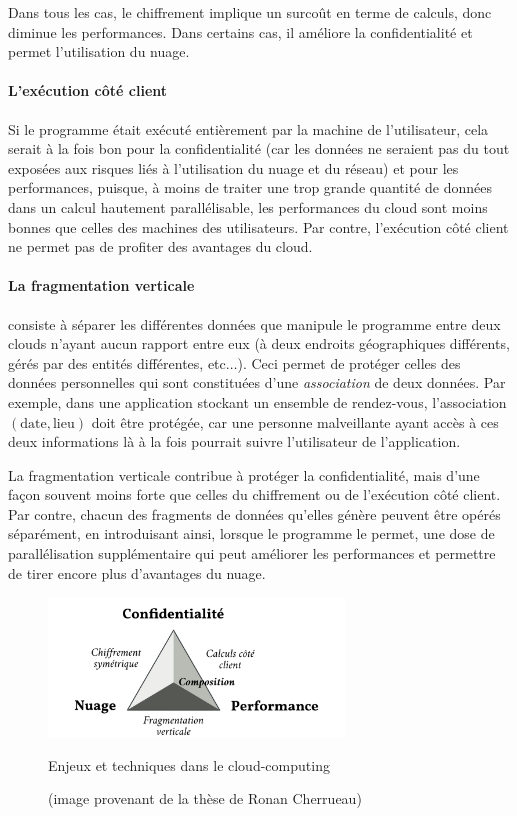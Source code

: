 Dans tous les cas, le chiffrement implique un surcoût en terme de calculs,
donc diminue les performances. Dans certains cas, il améliore la confidentialité
et permet l'utilisation du nuage.

\paragraph{L'exécution côté client}
Si le programme était exécuté entièrement par la machine de l'utilisateur,
cela serait à la fois bon pour la confidentialité (car les données
ne seraient pas du tout exposées aux risques liés à l'utilisation du nuage
et du réseau) et pour les performances, puisque, à moins de traiter une 
trop grande quantité de données dans un calcul hautement parallélisable,
les performances du cloud sont moins bonnes que celles des machines des utilisateurs.
Par contre, l'exécution côté client ne permet pas de profiter des avantages du cloud.

\paragraph{La fragmentation verticale} consiste à séparer les différentes données
que manipule le programme entre deux clouds n'ayant aucun rapport entre eux
(à deux endroits géographiques différents, gérés par des entités différentes,
etc$\dots$).
Ceci permet de protéger celles des données personnelles qui sont constituées d'une
\emph{association} de deux données. Par exemple, dans une application stockant
un ensemble de rendez-vous, l'association $(\mathrm{date}, \mathrm{lieu})$
doit être protégée, car une personne malveillante ayant accès à ces deux
informations là à la fois pourrait suivre l'utilisateur de l'application.

La fragmentation verticale contribue à protéger la confidentialité,
mais d'une façon souvent moins forte que celles du chiffrement
ou de l'exécution côté client. Par contre, chacun des fragments
de données qu'elles génère peuvent être opérés séparément, en introduisant
ainsi, lorsque le programme le permet, une dose de parallélisation
supplémentaire qui peut améliorer les performances et permettre de tirer
encore plus d'avantages du nuage.

\begin{figure}
	\begin{center}
		\includegraphics[width=0.7\textwidth]{snps.png}
		\caption{Enjeux et techniques dans le cloud-computing}
		\caption*{(image provenant de la thèse de Ronan Cherrueau)}
		\label{enjeux}
	\end{center}
\end{figure}

